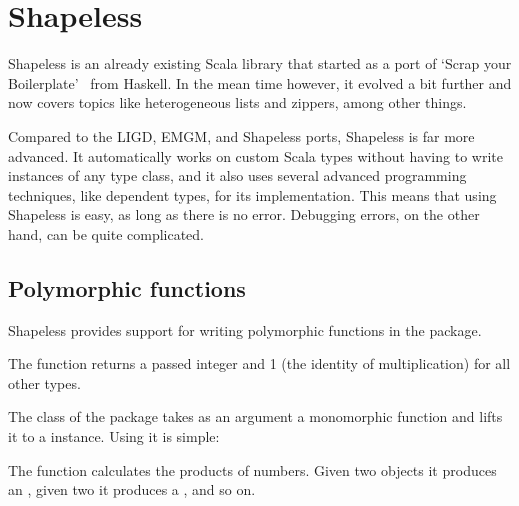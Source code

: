 \section{Shapeless}
\label{shapeless}

Shapeless is an already existing Scala library that started as a port of `Scrap your
Boilerplate'~\cite{DBLP:conf/tldi/LammelJ03} from Haskell. In the mean time however,
it evolved a bit further and now covers topics like heterogeneous lists and
zippers, among other things.

Compared to the LIGD, EMGM, and Shapeless ports, Shapeless is far more
advanced. It automatically works on custom Scala types without having to
write instances of any type class, and it also uses several advanced programming
techniques, like dependent types, for its implementation. This means that using
Shapeless is easy, as long as there is no error. Debugging errors, on the other
hand, can be quite complicated.

\subsection{Polymorphic functions}
Shapeless provides support for writing polymorphic functions in the
 package.

\begin{example}
  The function  returns a passed integer and 1 (the identity of
  multiplication) for all other types.

  
\end{example}

\begin{example}
  The class \cd{->} of the  package takes as an argument a monomorphic function
  and lifts it to a  instance. Using it is simple:

  
\end{example}

\begin{example}
  The function  calculates the products of numbers. Given two 
  objects it produces an , given two  it produces a ,
  and so on.
  
\end{example}

